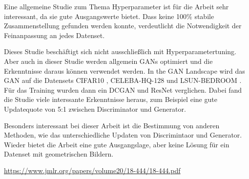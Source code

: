 Eine allgemeine Studie zum Thema Hyperparameter ist für die Arbeit sehr interessant, da sie gute Ausgangswerte bietet.
Dass keine 100\% stabile Zusammenstellung gefunden werden konnte, verdeutlicht die Notwendigkeit der Feinanpassung an jedes Datenset.


Dieses Studie beschäftigt sich nicht ausschließlich mit Hyperparametertuning.
Aber auch in dieser Studie werden allgemein GANs optimiert und die Erkenntnisse daraus können verwendet werden.
In the GAN Landscape wird das GAN auf die Datensets CIFAR10 \cite{dataset:cifar10}, CELEBA-HQ-128 und LSUN-BEDROOM \cite{dataset:lsun}.
Für das Training wurden dann ein DCGAN und ResNet verglichen.
Dabei fand die Studie viele interssante Erkenntnisse heraus, zum Beispiel eine gute Updatequote von 5:1 zwischen Discriminator und Generator.
\newline

Besonders interessant bei dieser Arbeit ist die Bestimmung von anderen Methoden, wie das unterschiedliche Updaten von Discrimintaor und Generator.
Wieder bietet die Arbeit eine gute Ausgangslage, aber keine Lösung für ein Datenset mit geometrischen Bildern.

\url{https://www.jmlr.org/papers/volume20/18-444/18-444.pdf}

